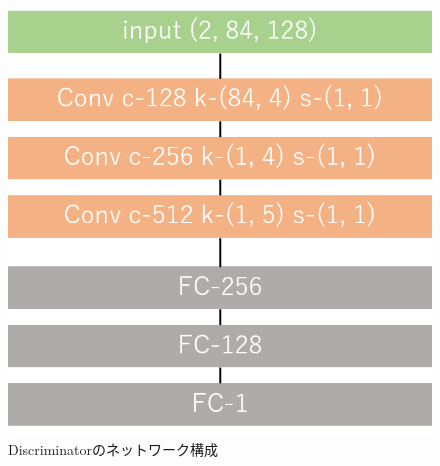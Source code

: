 \begin{figure}[htbp]
	\begin{center}
		\includegraphics[scale=0.7]{./images/generate-model/discriminator.png}
		\caption{Discriminatorのネットワーク構成}
		\label{fig:network-gan-dis}
	\end{center}
\end{figure}

\clearpage
